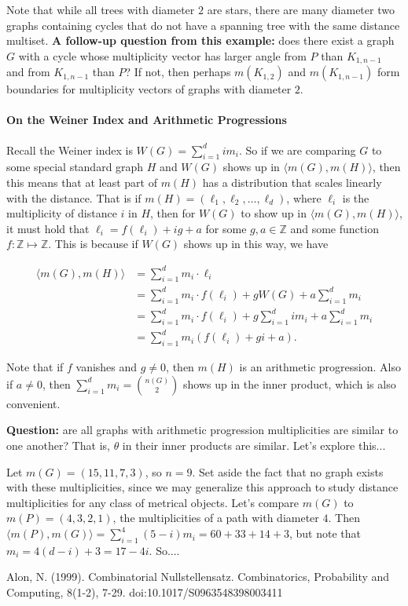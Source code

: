 \documentclass[12]{article}
\newcommand{\Z}{\mathbb{Z}}
\theoremstyle{definition}
\begin{document}
	Note that while all trees with diameter $2$ are stars, there are many diameter two graphs containing cycles that do not have a spanning tree with the same distance multiset.  \textbf{A follow-up question from this example:} does there exist a graph $G$ with a cycle whose multiplicity vector has larger angle from $P$ than $K_{1,n-1}$ and from $K_{1,n-1}$ than $P$?  If not, then perhaps $m(K_{1,2})$ and $m(K_{1,n-1})$ form boundaries for multiplicity vectors of graphs with diameter $2$.
	
	\paragraph{On the Weiner Index and Arithmetic Progressions}
	
	Recall the Weiner index is $W(G) = \sum_{i=1}^d im_i$.  So if we are comparing $G$ to some special standard graph $H$ and $W(G)$ shows up in $\langle m(G), m(H) \rangle$, then this means that at least part of $m(H)$ has a distribution that scales linearly with the distance.  That is if $m(H) = (\ell_1, \ell_2, \ldots, \ell_d)$, where $\ell_i$ is the multiplicity of distance $i$ in $H$, then for $W(G)$ to show up in $\langle m(G), m(H) \rangle$, it must hold that $\ell_i = f(\ell_i) + i g + a$ for some $g,a \in \Z$ and some function $f:\Z \mapsto \Z$.  This is because if $W(G)$ shows up in this way, we have
	
	\begin{align*}
		\langle m(G), m(H) \rangle &= \sum_{i=1}^d m_i \cdot \ell_i	\\
		&= 	\sum_{i=1}^d m_i \cdot f(\ell_i) + gW(G) + a\sum_{i=1}^d m_i\\
		&=  \sum_{i=1}^d m_i \cdot f(\ell_i) + g\sum_{i=1}^d im_i + a \sum_{i=1}^d m_i	\\
		&= 	\sum_{i=1}^d m_i(f(\ell_i) + gi + a).
	\end{align*}

	Note that if $f$ vanishes and $g \neq 0$, then $m(H)$ is an arithmetic progression.  Also if $a \neq 0$, then $\sum_{i=1}^d m_i = {n(G) \choose 2}$ shows up in the inner product, which is also convenient.
	
	\textbf{Question:} are all graphs with arithmetic progression multiplicities are similar to one another?  That is, $\theta$ in their inner products are similar. Let's explore this...
	
	Let $m(G) = (15,11,7,3)$, so $n = 9$.  Set aside the fact that no graph exists with these multiplicities, since we may generalize this approach to study distance multiplicities for any class of metrical objects.  Let's compare $m(G)$ to $m(P) = (4,3,2,1)$, the multiplicities of a path with diameter $4$.  Then $\langle m(P), m(G) \rangle = \sum_{i=1}^4 (5-i)m_i = 60 + 33 + 14 + 3$, but note that $m_i = 4(d-i)+3 = 17-4i$.  So....
	
	
	\newpage
	\begin{thebibliography}{100}
		 Alon, N. (1999). Combinatorial Nullstellensatz. Combinatorics, Probability and Computing, 8(1-2), 7-29. doi:10.1017/S0963548398003411
	\end{thebibliography}
	
\end{document}
